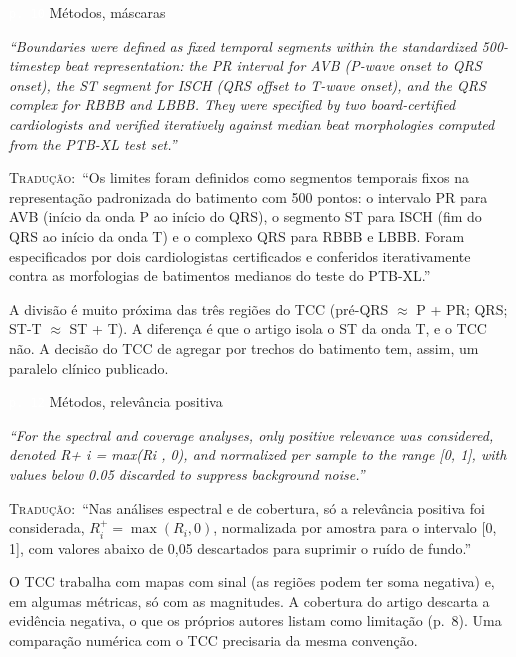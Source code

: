 \documentclass[11pt,a4paper]{article}
\newcommand{\pagechip}[1]{{\setlength{\fboxsep}{1.5pt}\colorbox{cAcc}{\textcolor{white}{\scriptsize\texttt{#1}}}}}
\newenvironment{origquote}{\par\itshape\small}{\par}
\newenvironment{tradquote}{\par\small\textsc{Tradução:}\ }{\par}
\newcommand{\explab}[1]{\par\smallskip{\small\color{cAcc}\textbf{\MakeUppercase{#1}}}\par}
\begin{document}
\begin{citacard}{\pagechip{p. 10} Métodos, máscaras}
\begin{origquote}“Boundaries were defined as fixed temporal segments within the standardized 500-timestep beat representation: the PR interval for AVB (P-wave onset to QRS onset), the ST segment for ISCH (QRS offset to T-wave onset), and the QRS complex for RBBB and LBBB. They were specified by two board-certified cardiologists and verified iteratively against median beat morphologies computed from the PTB-XL test set.”\end{origquote}
\begin{tradquote}“Os limites foram definidos como segmentos temporais fixos na representação padronizada do batimento com 500 pontos: o intervalo PR para AVB (início da onda P ao início do QRS), o segmento ST para ISCH (fim do QRS ao início da onda T) e o complexo QRS para RBBB e LBBB. Foram especificados por dois cardiologistas certificados e conferidos iterativamente contra as morfologias de batimentos medianos do teste do PTB-XL.”\end{tradquote}
\explab{Explicação}
A divisão é muito próxima das três regiões do TCC (pré-QRS $\approx$ P + PR; QRS; ST-T $\approx$ ST + T). A diferença é que o artigo isola o ST da onda T, e o TCC não. A decisão do TCC de agregar por trechos do batimento tem, assim, um paralelo clínico publicado.
\end{citacard}

\begin{citacard}{\pagechip{p. 12} Métodos, relevância positiva}
\begin{origquote}“For the spectral and coverage analyses, only positive relevance was considered, denoted R+ i = max(Ri , 0), and normalized per sample to the range [0, 1], with values below 0.05 discarded to suppress background noise.”\end{origquote}
\begin{tradquote}“Nas análises espectral e de cobertura, só a relevância positiva foi considerada, $R^+_i = \max(R_i, 0)$, normalizada por amostra para o intervalo [0, 1], com valores abaixo de 0,05 descartados para suprimir o ruído de fundo.”\end{tradquote}
\explab{Explicação}
O TCC trabalha com mapas com sinal (as regiões podem ter soma negativa) e, em algumas métricas, só com as magnitudes. A cobertura do artigo descarta a evidência negativa, o que os próprios autores listam como limitação (p.~8). Uma comparação numérica com o TCC precisaria da mesma convenção.
\end{citacard}
\end{document}
